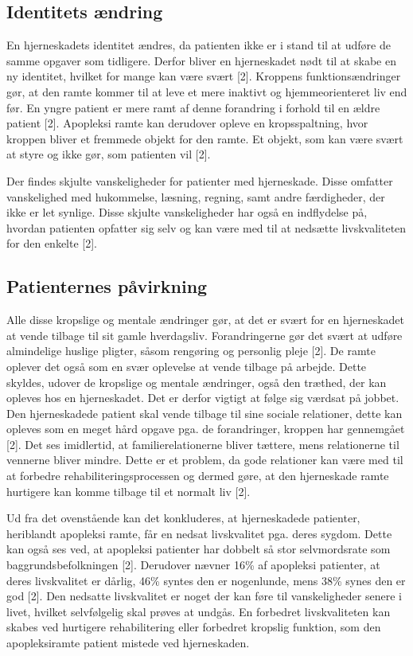 \subsection{Identitets ændring}
En hjerneskadets identitet ændres, da patienten ikke er i stand til at udføre de samme opgaver som tidligere. Derfor bliver en hjerneskadet nødt til at skabe en ny identitet, hvilket for mange kan være svært [2]. Kroppens funktionsændringer gør, at den ramte kommer til at leve et mere inaktivt og hjemmeorienteret liv end før. En yngre patient er mere ramt af denne forandring i forhold til en ældre patient [2]. Apopleksi ramte kan derudover opleve en kropsspaltning, hvor kroppen bliver et fremmede objekt for den ramte. Et objekt, som kan være svært at styre og ikke gør, som patienten vil [2]. 

Der findes skjulte vanskeligheder for patienter med hjerneskade. Disse omfatter vanskelighed med hukommelse, læsning, regning, samt andre færdigheder, der ikke er let synlige. Disse skjulte vanskeligheder har også en indflydelse på, hvordan patienten opfatter sig selv og kan være med til at nedsætte livskvaliteten for den enkelte [2]. 

\subsection{Patienternes påvirkning}
Alle disse kropslige og mentale ændringer gør, at det er svært for en hjerneskadet at vende tilbage til sit gamle hverdagsliv. Forandringerne gør det svært at udføre almindelige huslige pligter, såsom rengøring og personlig pleje [2]. De ramte oplever det også som en svær oplevelse at vende tilbage på arbejde. Dette skyldes, udover de kropslige og mentale ændringer, også den træthed, der kan opleves hos en hjerneskadet. Det er derfor vigtigt at følge sig værdsat på jobbet. Den hjerneskadede patient skal vende tilbage til sine sociale relationer,  dette kan opleves som en meget hård opgave pga. de forandringer, kroppen har gennemgået [2]. Det ses imidlertid, at familierelationerne bliver tættere, mens relationerne til vennerne bliver mindre. Dette er et problem, da gode relationer kan være med til at forbedre rehabiliteringsprocessen og dermed gøre, at den hjerneskade ramte hurtigere kan komme tilbage til et normalt liv [2].

Ud fra  det ovenstående kan det konkluderes, at hjerneskadede patienter, heriblandt apopleksi ramte, får en nedsat livskvalitet pga. deres sygdom. Dette kan også ses ved, at apopleksi patienter har dobbelt så stor selvmordsrate som baggrundsbefolkningen [2]. Derudover nævner 16\% af apopleksi patienter, at deres livskvalitet er dårlig, 46\% syntes den er nogenlunde, mens 38\% synes den er god [2]. Den nedsatte livskvalitet er noget der kan føre til vanskeligheder senere i livet, hvilket selvfølgelig skal prøves at undgås. En forbedret livskvaliteten kan skabes ved hurtigere rehabilitering eller forbedret kropslig funktion, som den apopleksiramte patient mistede ved hjerneskaden.  

